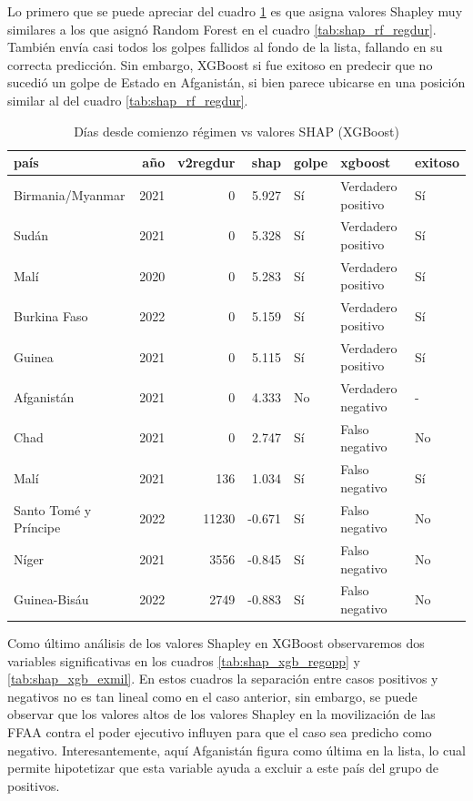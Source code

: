 \documentclass{article}
\begin{document}
Lo primero que se puede apreciar del cuadro \ref{tab:shap_xgb_regdur} es que asigna valores Shapley
muy similares a los que asignó Random Forest en el cuadro \ref{tab:shap_rf_regdur}. También envía casi
todos los golpes fallidos al fondo de la lista, fallando en su correcta predicción. Sin embargo,
XGBoost si fue exitoso en predecir que no sucedió un golpe de Estado en Afganistán, si bien parece
ubicarse en una posición similar al del cuadro \ref{tab:shap_rf_regdur}.

\begin{table}[H]
 \centering
 \begin{tabular}{lrrrlll}
  \toprule
  país & año & v2regdur & shap & golpe & xgboost & exitoso \\
  \midrule
  Birmania/Myanmar & 2021 & 0 & 5.927 & Sí & Verdadero positivo & Sí \\
  Sudán & 2021 & 0 & 5.328 & Sí & Verdadero positivo & Sí \\
  Malí & 2020 & 0 & 5.283 & Sí & Verdadero positivo & Sí \\
  Burkina Faso & 2022 & 0 & 5.159 & Sí & Verdadero positivo & Sí \\
  Guinea & 2021 & 0 & 5.115 & Sí & Verdadero positivo & Sí \\
  Afganistán & 2021 & 0 & 4.333 & No & Verdadero negativo & - \\
  Chad & 2021 & 0 & 2.747 & Sí & Falso negativo & No \\
  Malí & 2021 & 136 & 1.034 & Sí & Falso negativo & Sí \\
  Santo Tomé y Príncipe & 2022 & 11230 & -0.671 & Sí & Falso negativo & No \\
  Níger & 2021 & 3556 & -0.845 & Sí & Falso negativo & No \\
  Guinea-Bisáu & 2022 & 2749 & -0.883 & Sí & Falso negativo & No \\
  \bottomrule
  \end{tabular}
  \caption{Días desde comienzo régimen vs valores SHAP (XGBoost) \label{tab:shap_xgb_regdur}}
 \end{table}

Como último análisis de los valores Shapley en XGBoost observaremos dos variables significativas en
los cuadros \ref{tab:shap_xgb_regopp} y \ref{tab:shap_xgb_exmil}. En estos cuadros la separación entre
casos positivos y negativos no es tan lineal como en el caso anterior, sin embargo, se puede observar
que los valores altos de los valores Shapley en la movilización de las FFAA contra el poder ejecutivo
influyen para que el caso sea predicho como negativo. Interesantemente, aquí Afganistán figura como 
última en la lista, lo cual permite hipotetizar que esta variable ayuda a excluir a este país del grupo
de positivos.
\end{document}
